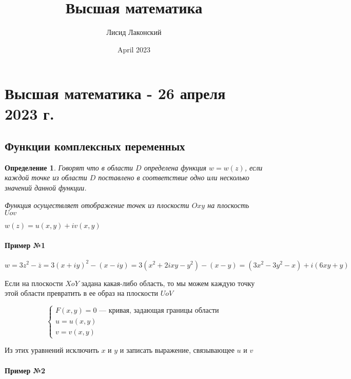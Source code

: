 \documentclass{article}
\title{Высшая математика}
\author{Лисид Лаконский}
\date{April 2023}
\newtheorem{definition}{Определение}
\begin{document}
\raggedright

\maketitle

\tableofcontents
\pagebreak

\section{Высшая математика - 26 апреля 2023 г.}

\subsection{Функции комплексных переменных}

\begin{definition}
Говорят что в области $D$ определена функция $w = w(z)$, если каждой точке из области $D$ поставлено в соответствие одно или несколько значений данной функции.

Функция осуществляет отображение точек из плоскости $O x y$ на плоскость $U o v$
\end{definition}

$w(z) = u(x, y) + i v (x, y)$

\paragraph{Пример №1}

$w = 3 z^2 - \overline{z} = 3 (x + i y)^2 - (x - i y) = 3 (x^2 + 2 i x y - y^2) - (x - y) = (3x^2 - 3y^2 - x) + i (6 x y + y)$

\hfill

Если на плоскости $X o Y$ задана какая-либо область, то мы можем каждую точку этой области превратить в ее образ на плоскости $U o V$

$$
\begin{cases}
F(x, y) = 0 \text{ — кривая, задающая границы области} \\
u = u(x, y) \\ 
v = v(x, y)
\end{cases}
$$

Из этих уравнений исключить $x$ и $y$ и записать выражение, связывающее $u$ и $v$

\hfill

\paragraph{Пример №2}
\end{document}
